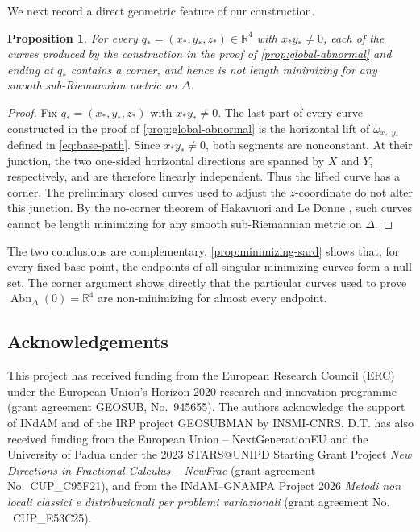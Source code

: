 \documentclass[11pt]{amsart}
\newtheorem{proposition}[theorem]{Proposition}
\numberwithin{equation}{section}
\theoremstyle{remark}
\newcommand{\R}{\mathbb R}
\newcommand{\Abn}{\operatorname{Abn}}
\begin{document}
We next record a direct geometric feature of our construction.  
\begin{proposition}
For every
$q_*=(x_*, y_*, z_*)\in\R^4$ with $x_*y_*\neq 0$, each of the curves produced by the
construction in the proof of \cref{prop:global-abnormal} and
ending at $q_*$ contains a corner, and hence is not length minimizing for
any smooth sub-Riemannian metric on $\Delta$.
\end{proposition}

\begin{proof}
 Fix $q_*=(x_*,y_*,z_*)$ with $x_*y_*\neq 0$.  The last
part of every curve constructed in the proof of
\cref{prop:global-abnormal} is the horizontal lift of
$\omega_{x_*,y_*}$ defined in \eqref{eq:base-path}.
Since $x_*y_*\neq0$, both segments are nonconstant.  At their junction,
the two one-sided horizontal directions are spanned by $X$ and $Y$,
respectively, and are therefore linearly independent.  Thus the lifted
curve has a corner.  The preliminary closed curves used to adjust the
$z$-coordinate do not alter this junction.  By the no-corner theorem of
Hakavuori and Le Donne \cite{HLD}, such curves cannot be length minimizing
for any smooth sub-Riemannian metric on $\Delta$.
\end{proof}

The two conclusions are complementary.  \cref{prop:minimizing-sard}
shows that, for every fixed base point, the endpoints of all singular
minimizing curves form a null set.  The corner argument
shows directly that the particular curves used to prove
$\Abn_\Delta(0)=\R^4$ are non-minimizing for almost every endpoint.

\subsection*{Acknowledgements}
This project has received funding from the European Research Council
(ERC) under the European Union's Horizon 2020 research and innovation
programme (grant agreement GEOSUB, No.~945655). The authors
acknowledge the support of INdAM and of the IRP project GEOSUBMAN by
INSMI-CNRS. D.T. has also
received funding from the
European Union -- NextGenerationEU and the University of Padua under the 2023
STARS@UNIPD  Starting Grant Project \textit{New Directions in Fractional
Calculus -- NewFrac} (grant agreement No.\ CUP\_C95\-F21), and from the INdAM--GNAMPA Project 2026 \textit{Metodi
non locali classici e distribuzionali per problemi variazionali} (grant agreement No. \ CUP\_E53\-C25).
\end{document}
